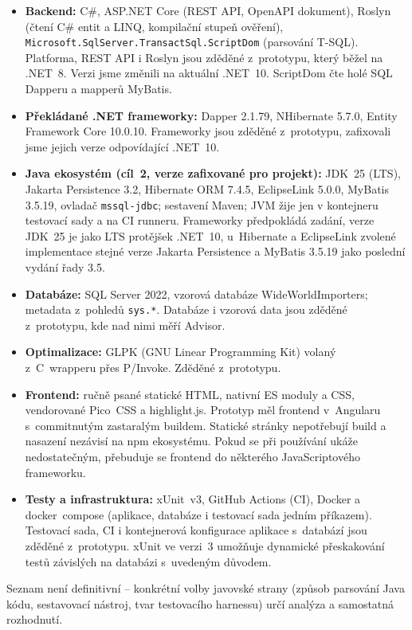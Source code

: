 \documentclass{article}
\begin{document}
\begin{itemize}[leftmargin=*,itemsep=0pt]
\item \textbf{Backend:} C\#, ASP.NET Core (REST API, OpenAPI dokument), Roslyn (čtení C\# entit a LINQ, kompilační stupeň ověření), \texttt{Microsoft.SqlServer.TransactSql.ScriptDom} (parsování T-SQL). Platforma, REST API i Roslyn jsou zděděné z~prototypu, který běžel na .NET~8. Verzi jsme změnili na aktuální .NET~10. ScriptDom čte holé SQL Dapperu a mapperů MyBatis.
\item \textbf{Překládané .NET frameworky:} Dapper 2.1.79, NHibernate 5.7.0, Entity Framework Core 10.0.10. Frameworky jsou zděděné z~prototypu, zafixovali jsme jejich verze odpovídající .NET~10.
\item \textbf{Java ekosystém (cíl~2, verze zafixované pro projekt):} JDK~25 (LTS), Jakarta Persistence 3.2, Hibernate ORM 7.4.5, EclipseLink 5.0.0, MyBatis 3.5.19, ovladač \texttt{mssql-jdbc}; sestavení Maven; JVM žije jen v kontejneru testovací sady a na CI runneru. Frameworky předpokládá zadání, verze JDK~25 je jako LTS protějšek .NET~10, u~Hibernate a EclipseLink zvolené implementace stejné verze Jakarta Persistence a MyBatis 3.5.19 jako poslední vydání řady 3.5.
\item \textbf{Databáze:} SQL Server 2022, vzorová databáze WideWorldImporters; metadata z~pohledů \texttt{sys.*}. Databáze i vzorová data jsou zděděné z~prototypu, kde nad nimi měří Advisor.
\item \textbf{Optimalizace:} GLPK (GNU Linear Programming Kit) volaný z~C~wrapperu přes P/Invoke. Zděděné z~prototypu.
\item \textbf{Frontend:} ručně psané statické HTML, nativní ES moduly a CSS, vendorované Pico~CSS a highlight.js. Prototyp měl frontend v~Angularu s~commitnutým zastaralým buildem. Statické stránky nepotřebují build a nasazení nezávisí na npm ekosystému. Pokud se při používání ukáže nedostatečným, přebuduje se frontend do některého JavaScriptového frameworku.
\item \textbf{Testy a infrastruktura:} xUnit~v3, GitHub Actions (CI), Docker a docker~compose (aplikace, databáze i testovací sada jedním příkazem). Testovací sada, CI i kontejnerová konfigurace aplikace s~databází jsou zděděné z~prototypu. xUnit ve verzi~3 umožňuje dynamické přeskakování testů závislých na databázi s~uvedeným důvodem.
\end{itemize}

Seznam není definitivní -- konkrétní volby javovské strany (způsob parsování Java kódu, sestavovací nástroj, tvar testovacího harnessu) určí analýza a samostatná rozhodnutí.
\end{document}
